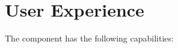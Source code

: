 \chapter{User Experience}\label{ch:ekg-mm-c-3}

The  component has the following capabilities:

\begin{itemize}[leftmargin=.5in]
\end{itemize}





